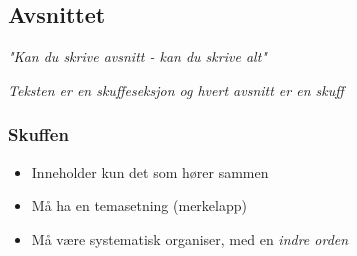 \subsection*{Avsnittet}

\textit{"Kan du skrive avsnitt - kan du skrive alt"} 

\textit{Teksten er en skuffeseksjon og hvert avsnitt er en skuff}

\subsubsection*{Skuffen}

\begin{itemize}
    \item Inneholder kun det som hører sammen
    \item Må ha en temasetning (merkelapp)
    \item Må være systematisk organiser, med en \textit{indre orden}
\end{itemize}

